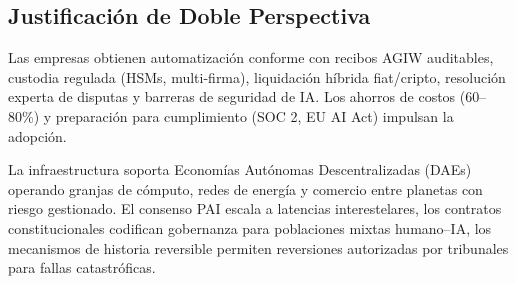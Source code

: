 \documentclass[11pt]{article}
\begin{document}
\subsection{Justificación de Doble Perspectiva}
\begin{description}[style=nextline]
  \item[Corto Plazo (Era MERCURY)] Las empresas obtienen automatización conforme con recibos AGIW auditables, custodia regulada (HSMs, multi-firma), liquidación híbrida fiat/cripto, resolución experta de disputas y barreras de seguridad de IA. Los ahorros de costos (60--80\%) y preparación para cumplimiento (SOC 2, EU AI Act) impulsan la adopción.
  \item[Escala de Siglos (VENUS hasta ANDROMEDA)] La infraestructura soporta Economías Autónomas Descentralizadas (DAEs) operando granjas de cómputo, redes de energía y comercio entre planetas con riesgo gestionado. El consenso PAI escala a latencias interestelares, los contratos constitucionales codifican gobernanza para poblaciones mixtas humano--IA, los mecanismos de historia reversible permiten reversiones autorizadas por tribunales para fallas catastróficas.
\end{description}
\end{document}
